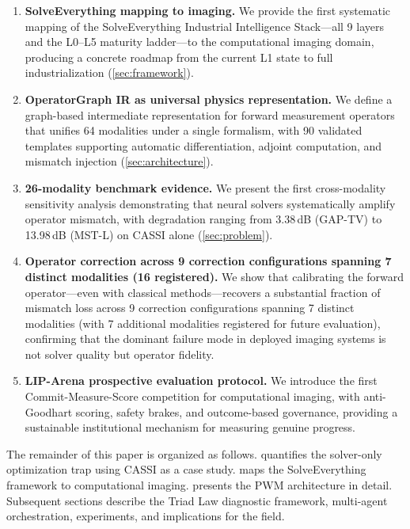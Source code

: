 \begin{enumerate}
  \item \textbf{SolveEverything mapping to imaging.}
        We provide the first systematic mapping of the SolveEverything
        Industrial Intelligence Stack---all 9 layers and the L0--L5
        maturity ladder---to the computational imaging domain, producing
        a concrete roadmap from the current L1 state to full
        industrialization (\cref{sec:framework}).

  \item \textbf{OperatorGraph IR as universal physics representation.}
        We define a graph-based intermediate representation for forward
        measurement operators that unifies 64 modalities under a single
        formalism, with 90 validated templates supporting automatic
        differentiation, adjoint computation, and mismatch injection
        (\cref{sec:architecture}).

  \item \textbf{26-modality benchmark evidence.}
        We present the first cross-modality sensitivity analysis
        demonstrating that neural solvers systematically amplify
        operator mismatch, with degradation ranging from 3.38\,dB
        (GAP-TV) to 13.98\,dB (MST-L) on CASSI alone
        (\cref{sec:problem}).

  \item \textbf{Operator correction across 9 correction configurations
        spanning 7 distinct modalities (16 registered).}
        We show that calibrating the forward operator---even with
        classical methods---recovers a substantial fraction of mismatch
        loss across 9 correction configurations spanning 7 distinct modalities (with 7 additional
        modalities registered for future evaluation), confirming that the
        dominant failure mode in deployed imaging systems is not solver
        quality but operator fidelity.

  \item \textbf{LIP-Arena prospective evaluation protocol.}
        We introduce the first Commit-Measure-Score competition for
        computational imaging, with anti-Goodhart scoring, safety
        brakes, and outcome-based governance, providing a sustainable
        institutional mechanism for measuring genuine progress.
\end{enumerate}

The remainder of this paper is organized as follows.
 quantifies the solver-only optimization trap using
CASSI as a case study.
 maps the SolveEverything framework to
computational imaging.
 presents the PWM architecture in detail.
Subsequent sections describe the Triad Law diagnostic framework,
multi-agent orchestration, experiments, and implications for the field.
